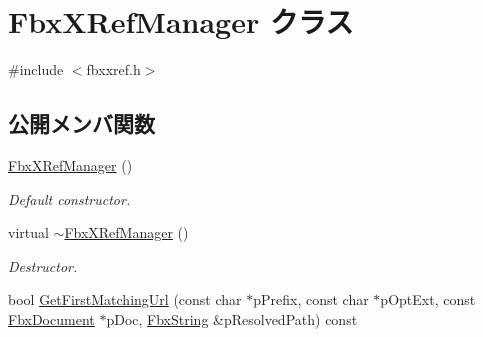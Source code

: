 \hypertarget{class_fbx_x_ref_manager}{}\section{Fbx\+X\+Ref\+Manager クラス}
\label{class_fbx_x_ref_manager}


{\ttfamily \#include $<$fbxxref.\+h$>$}

\subsection*{公開メンバ関数}
\begin{DoxyCompactItemize}
\item 
\hyperlink{class_fbx_x_ref_manager_a2dda0d87e53185abe5d62b305902027b}{Fbx\+X\+Ref\+Manager} ()
\begin{DoxyCompactList}\small\item\em Default constructor. \end{DoxyCompactList}\item 
virtual \hyperlink{class_fbx_x_ref_manager_ad15e856756afd34a1b85bf924e389aea}{$\sim$\+Fbx\+X\+Ref\+Manager} ()
\begin{DoxyCompactList}\small\item\em Destructor. \end{DoxyCompactList}\item 
bool \hyperlink{class_fbx_x_ref_manager_a6b1ea164fac8604da02b6016165d56fe}{Get\+First\+Matching\+Url} (const char $\ast$p\+Prefix, const char $\ast$p\+Opt\+Ext, const \hyperlink{class_fbx_document}{Fbx\+Document} $\ast$p\+Doc, \hyperlink{class_fbx_string}{Fbx\+String} \&p\+Resolved\+Path) const
\end{DoxyCompactItemize}
